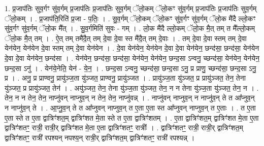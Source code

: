 \documentclass[17pt]{extarticle}
\begin{document}
1. प्र॒जाप॑तिः सुव॒र्गꣳ सु॑व॒र्गम् प्र॒जाप॑तिः प्र॒जाप॑तिः सुव॒र्गम् ॅलो॒कम् ॅलो॒कꣳ सु॑व॒र्गम् प्र॒जाप॑तिः प्र॒जाप॑तिः सुव॒र्गम् ॅलो॒कम् । . प्र॒जाप॑ति॒रिति॑ प्र॒जा - प॒तिः॒ । . सु॒व॒र्गम् ॅलो॒कम् ॅलो॒कꣳ सु॑व॒र्गꣳ सु॑व॒र्गम् ॅलो॒क मै॑दै ल्लो॒कꣳ सु॑व॒र्गꣳ सु॑व॒र्गम् ॅलो॒क मै᳚त् । . सु॒व॒र्गमिति॑ सुवः - गम् । . लो॒क मै॑दै ल्लो॒कम् ॅलो॒क मै॒त् तम् त मै᳚ल्लो॒कम् ॅलो॒क मै॒त् तम् । . ऐ॒त् तम् तमै॑दै॒त् तम् दे॒वा दे॒वा स्त मै॑दै॒त् तम् दे॒वाः । . तम् दे॒वा दे॒वा स्तम् तम् दे॒वा येन॑येन॒ येन॑येन दे॒वा स्तम् तम् दे॒वा येन॑येन । . दे॒वा येन॑येन॒ येन॑येन दे॒वा दे॒वा येन॑येन॒ छन्द॑सा॒ छन्द॑सा॒ येन॑येन दे॒वा दे॒वा येन॑येन॒ छन्द॑सा । . येन॑येन॒ छन्द॑सा॒ छन्द॑सा॒ येन॑येन॒ येन॑येन॒ छन्द॒सा ऽन्वनु॒ च्छन्द॑सा॒ येन॑येन॒ येन॑येन॒ छन्द॒सा ऽनु॑ । . येन॑ये॒नेति॒ येन॑ - ये॒न॒ । . छन्द॒सा ऽन्वनु॒ च्छन्द॑सा॒ छन्द॒सा ऽनु॒ प्र प्राणु॒ च्छन्द॑सा॒ छन्द॒सा ऽनु॒ प्र । . अनु॒ प्र प्राण्वनु॒ प्रायु॑ञ्ज॒ता यु॑ञ्जत॒ प्राण्वनु॒ प्रायु॑ञ्जत । . प्रायु॑ञ्ज॒ता यु॑ञ्जत॒ प्र प्रायु॑ञ्जत॒ तेन॒ तेना यु॑ञ्जत॒ प्र प्रायु॑ञ्जत॒ तेन॑ । . अयु॑ञ्जत॒ तेन॒ तेना यु॑ञ्ज॒ता यु॑ञ्जत॒ तेन॒ न न तेना यु॑ञ्ज॒ता यु॑ञ्जत॒ तेन॒ न । . तेन॒ न न तेन॒ तेन॒ नाप्नु॑वन् नाप्नुव॒न् न तेन॒ तेन॒ नाप्नु॑वन्न् । . नाप्नु॑वन् नाप्नुव॒न् न नाप्नु॑व॒न् ते त आ᳚प्नुव॒न् न नाप्नु॑व॒न् ते । . आ॒प्नु॒व॒न् ते त आ᳚प्नुवन् नाप्नुव॒न् त ए॒ता ए॒ता स्त आ᳚प्नुवन् नाप्नुव॒न् त ए॒ताः । . त ए॒ता ए॒ता स्ते त ए॒ता द्वात्रिꣳ॑शत॒म् द्वात्रिꣳ॑शत मे॒ता स्ते त ए॒ता द्वात्रिꣳ॑शतम् । . ए॒ता द्वात्रिꣳ॑शत॒म् द्वात्रिꣳ॑शत मे॒ता ए॒ता द्वात्रिꣳ॑शतꣳ॒॒ रात्री॒ रात्री॒र् द्वात्रिꣳ॑शत मे॒ता ए॒ता द्वात्रिꣳ॑शतꣳ॒॒ रात्रीः᳚ । . द्वात्रिꣳ॑शतꣳ॒॒ रात्री॒ रात्री॒र् द्वात्रिꣳ॑शत॒म् द्वात्रिꣳ॑शतꣳ॒॒ रात्री॑ रपश्यन् नपश्य॒न् रात्री॒र् द्वात्रिꣳ॑शत॒म् द्वात्रिꣳ॑शतꣳ॒॒ रात्री॑ रपश्यन्न् । \newline
\end{document}
